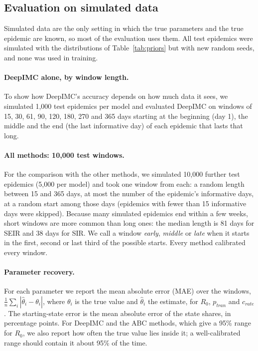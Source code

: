 \documentclass[12pt]{article}
\begin{document}
\subsection{Evaluation on simulated data}\label{sec:eval-sim}

Simulated data are the only setting in which the true parameters and the true epidemic are known, so
most of the evaluation uses them. All test epidemics were simulated with the distributions of
Table~\ref{tab:priors} but with new random seeds, and none was used in training.

\paragraph{DeepIMC alone, by window length.} To show how DeepIMC's accuracy depends on how much data it
sees, we simulated 1,000 test epidemics per model and evaluated DeepIMC on windows of 15, 30, 61, 90,
120, 180, 270 and 365 days starting at the beginning (day 1), the middle and the end (the last informative
day) of each epidemic that lasts that long.

\paragraph{All methods: 10,000 test windows.} For the comparison with the other methods, we simulated
10,000 further test epidemics (5,000 per model) and took one window from each: a random length between
15 and 365 days, at most the number of the epidemic's informative days, at a random start among those
days (epidemics with fewer than 15 informative days were skipped). Because many simulated epidemics end
within a few weeks, short windows are more common than long ones: the median length is 81 days for SEIR
and 38 days for SIR. We call a window \emph{early}, \emph{middle} or \emph{late} when it starts in the
first, second or last third of the possible starts. Every method calibrated every window.

\paragraph{Parameter recovery.} For each parameter we report the mean absolute error (MAE) over the
windows, $\frac1n\sum_i|\hat\theta_i-\theta_i|$, where $\theta_i$ is the true value and $\hat\theta_i$
the estimate, for $R_0$, $p_{tran}$ and $c_{rate}$. The starting-state error is the mean absolute error
of the state shares, in percentage points. For DeepIMC and the ABC methods, which give a 95\% range for
$R_0$, we also report how often the true value lies inside it; a well-calibrated range should contain it
about 95\% of the time.
\end{document}

